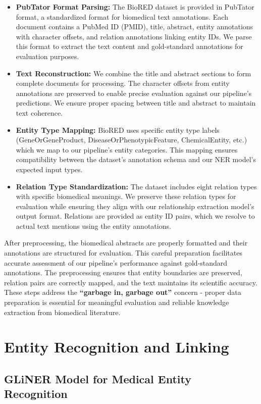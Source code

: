 \begin{itemize}
\item \textbf{PubTator Format Parsing:} The BioRED dataset is provided in PubTator format, a standardized format for biomedical text annotations. Each document contains a PubMed ID (PMID), title, abstract, entity annotations with character offsets, and relation annotations linking entity IDs. We parse this format to extract the text content and gold-standard annotations for evaluation purposes.
\item \textbf{Text Reconstruction:} We combine the title and abstract sections to form complete documents for processing. The character offsets from entity annotations are preserved to enable precise evaluation against our pipeline's predictions. We ensure proper spacing between title and abstract to maintain text coherence.
\item \textbf{Entity Type Mapping:} BioRED uses specific entity type labels (GeneOrGeneProduct, DiseaseOrPhenotypicFeature, ChemicalEntity, etc.) which we map to our pipeline's entity categories. This mapping ensures compatibility between the dataset's annotation schema and our NER model's expected input types.
\item \textbf{Relation Type Standardization:} The dataset includes eight relation types with specific biomedical meanings. We preserve these relation types for evaluation while ensuring they align with our relationship extraction model's output format. Relations are provided as entity ID pairs, which we resolve to actual text mentions using the entity annotations.
\end{itemize}

After preprocessing, the biomedical abstracts are properly formatted and their annotations are structured for evaluation. This careful preparation facilitates accurate assessment of our pipeline's performance against gold-standard annotations. The preprocessing ensures that entity boundaries are preserved, relation pairs are correctly mapped, and the text maintains its scientific accuracy. These steps address the \textbf{``garbage in, garbage out''} concern - proper data preparation is essential for meaningful evaluation and reliable knowledge extraction from biomedical literature.

\section{Entity Recognition and Linking}

\subsection{GLiNER Model for Medical Entity Recognition}
\label{sec:gliner}


